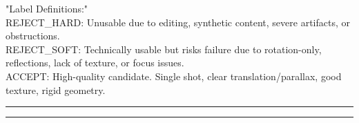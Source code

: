 \noindent "Label Definitions:" \\
{REJECT\_HARD}: Unusable due to editing, synthetic content, severe artifacts, or obstructions. \\
{REJECT\_SOFT}: Technically usable but risks failure due to rotation-only, reflections, lack of texture, or focus issues. \\
{ACCEPT}: High-quality candidate. Single shot, clear translation/parallax, good texture, rigid geometry.
\endgroup

{
  \vspace{0.5em}
  \color{linegreen}
  \hrule
  \vspace{1pt}
  \hrule
  \vspace{1em}
}
